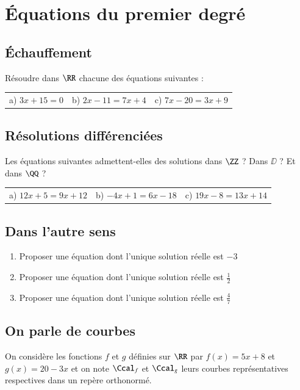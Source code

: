 \documentclass[oneside,12pt]{article}          %
\begin{document}
\section{Équations du premier degré}

\subsection{Échauffement}
Résoudre dans $\RR$ chacune des équations suivantes :

\renewcommand{\arraystretch}{1.5}
\begin{tabular}{p{} p{} p{}}
	a) $3x+15=0$ & b) $2x-11=7x+4$ & c) $7x-20=3x+9$
\end{tabular}



\subsection{Résolutions différenciées}
Les équations suivantes admettent-elles des solutions dans $\ZZ$ ? Dans $\DD$ ? Et dans $\QQ$ ?
	
\renewcommand{\arraystretch}{1.5}
\begin{tabular}{p{} p{} p{}}
	a) $12x + 5 = 9x + 12$ & b) $-4x + 1 = 6x - 18$ & c) $19x - 8 = 13x + 14$
\end{tabular}



\subsection{Dans l'autre sens}
\begin{enumerate}
	\item Proposer une équation dont l'unique solution réelle est $-3$
	\item Proposer une équation dont l'unique solution réelle est $\frac{1}{2}$
	\item Proposer une équation dont l'unique solution réelle est $\frac{4}{7}$
\end{enumerate}



\subsection{On parle de courbes}
On considère les fonctions $f$ et $g$ définies sur $\RR$ par $f(x) = 5x + 8$ et $g(x) = 20 - 3x$ et on note $\Ccal_f$ et $\Ccal_g$ leurs courbes représentatives respectives dans un repère orthonormé.
\end{document}
